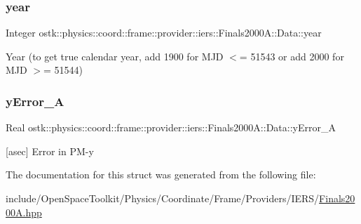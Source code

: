 \subsubsection{\texorpdfstring{year}{year}}
{\footnotesize\ttfamily Integer ostk\+::physics\+::coord\+::frame\+::provider\+::iers\+::\+Finals2000\+A\+::\+Data\+::year}



Year (to get true calendar year, add 1900 for M\+JD $<$= 51543 or add 2000 for M\+JD $>$= 51544) 

\mbox{\label{structostk_1_1physics_1_1coord_1_1frame_1_1provider_1_1iers_1_1_finals2000_a_1_1_data_a532cbc4a06e66819bbc795225f04b52c}} 
\subsubsection{\texorpdfstring{y\+Error\+\_\+A}{yError\_A}}
{\footnotesize\ttfamily Real ostk\+::physics\+::coord\+::frame\+::provider\+::iers\+::\+Finals2000\+A\+::\+Data\+::y\+Error\+\_\+A}



\mbox{[}asec\mbox{]} Error in P\+M-\/y 



The documentation for this struct was generated from the following file\+:\begin{DoxyCompactItemize}
\item 
include/\+Open\+Space\+Toolkit/\+Physics/\+Coordinate/\+Frame/\+Providers/\+I\+E\+R\+S/\hyperlink{_finals2000_a_8hpp}{Finals2000\+A.\+hpp}\end{DoxyCompactItemize}
